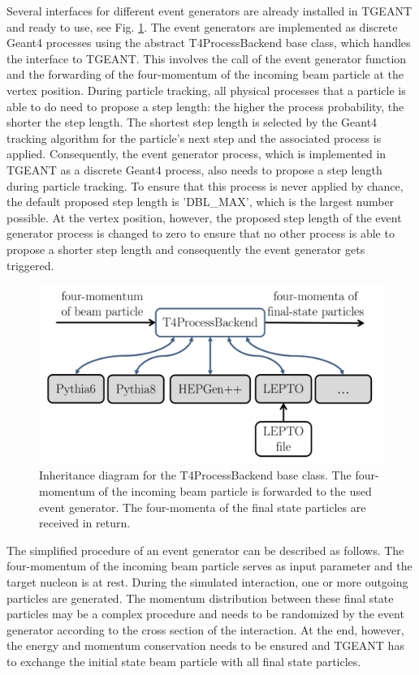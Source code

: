 Several interfaces for different event generators are already installed in TGEANT and ready to use, see Fig. \ref{pic:Processbackend}. The event generators are implemented as discrete Geant4 processes using the abstract T4ProcessBackend base class, which handles the interface to TGEANT. This involves the call of the event generator function and the forwarding of the four-momentum of the incoming beam particle at the vertex position.
During particle tracking, all physical processes that a particle is able to do need to propose a step length: the higher the process probability, the shorter the step length. The shortest step length is selected by the Geant4 tracking algorithm for the particle’s next step and the associated process is applied. Consequently, the event generator process, which is implemented in TGEANT as a discrete Geant4 process, also needs to propose a step length during particle tracking. To ensure that this process is never applied by chance, the default proposed step length is 'DBL\_MAX', which is the largest number possible. At the vertex position, however, the proposed step length of the event generator process is changed to zero to ensure that no other process is able to propose a shorter step length and consequently the event generator gets triggered.

\begin{figure}[!h]
  \centering
	\includegraphics[scale=0.5]{./gfx/Processbackend.png}
	\caption{Inheritance diagram for the T4ProcessBackend base class. The four- momentum of the incoming beam particle is forwarded to the used event generator. The four-momenta of the final state particles are received in return.}
	\label{pic:Processbackend}
\end{figure}

The simplified procedure of an event generator can be described as follows. The four-momentum of the incoming beam particle serves as input parameter and the target nucleon is at rest. During the simulated interaction, one or more outgoing particles are generated. The momentum distribution between these final state particles may be a complex procedure and needs to be randomized by the event generator according to the cross section of the interaction. At the end, however, the energy and momentum conservation needs to be ensured and TGEANT has to exchange the initial state beam particle with all final state particles.


